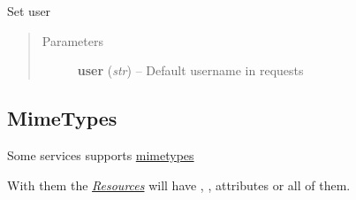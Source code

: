 \documentclass[letterpaper,10pt,english]{sphinxmanual}
\begin{document}
\begin{fulllineitems}
\begin{fulllineitems}
\begin{quote}
\begin{description}
\end{description}\end{quote}

\end{fulllineitems}


\begin{fulllineitems}
\label{services:pygithub3.services.base.Service.set_user}
Set user
\begin{quote}\begin{description}
\item[{Parameters}] \leavevmode
\textbf{user} (\emph{str}) -- Default username in requests

\end{description}\end{quote}

\end{fulllineitems}


\end{fulllineitems}



\subsection{MimeTypes}
\label{services:mimetypes-section}\label{services:mimetypes}
Some services supports \href{http://developer.github.com/v3/mime}{mimetypes}

With them the {\hyperref[resources::doc]{\emph{Resources}}} will have , , 
attributes or all of them.
\end{document}
